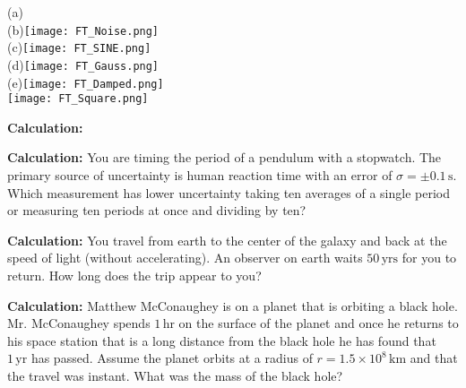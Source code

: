 \documentclass[11pt]{exam}
\newcommand{\unit}[1]{\ensuremath{\, \mathrm{#1}}}
\begin{document}
\begin{questions}
\begin{multicols}{2}
\columnbreak

(a)\\
(b)\texttt{[image: FT\_Noise.png]}\\
(c)\texttt{[image: FT\_SINE.png]}\\
(d)\texttt{[image: FT\_Gauss.png]}\\
(e)\texttt{[image: FT\_Damped.png]}\\
\hspace*{0.18in}\texttt{[image: FT\_Square.png]}\\
\end{multicols}

\newpage
\addpoints
\question[5]\textbf{Calculation:}
\noaddpoints
{}

\newpage
\addpoints
\question[5]\textbf{Calculation:} You are timing the period of a pendulum with a stopwatch. The primary source of uncertainty is human reaction time with an error of $\sigma=\pm0.1\unit{s}$. Which measurement has lower uncertainty taking ten averages of a single period or measuring ten periods at once and dividing by ten? 
\vspace{4.5in}

\addpoints
\question[5]\textbf{Calculation:} You travel from earth to the center of the galaxy and back at the speed of light (without accelerating). An observer on earth waits $50\unit{yrs}$ for you to return. How long does the trip appear to you?
\vspace{4.5in}

\newpage
\addpoints
\question[5]\textbf{Calculation:} Matthew McConaughey is on a planet that is orbiting a black hole. Mr. McConaughey spends $1\unit{hr}$ on the surface of the planet and once he returns to his space station that is a long distance from the black hole he has found that $1\unit{yr}$ has passed. Assume the planet orbits at a radius of $r=1.5\times10^8\unit{km}$ and that the travel was instant. What was the mass of the black hole? 
\vspace{4.5in}


\end{questions}
\end{document}
